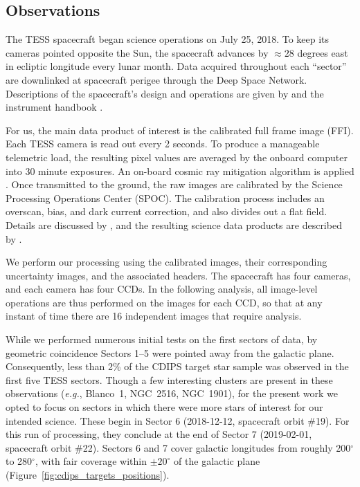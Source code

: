 \documentclass[12pt,twocolumn,tighten]{aastex62}
\begin{document}
\subsection{Observations}
\label{subsec:observations}


The TESS spacecraft began science operations on July 25, 2018.  To
keep its cameras pointed opposite the Sun, the spacecraft advances by
$\approx$$28$ degrees east in ecliptic longitude every lunar month.
Data acquired throughout each ``sector'' are downlinked at spacecraft
perigee through the Deep Space Network.  Descriptions of the
spacecraft's design and operations are given by
\citet{ricker_transiting_2015} and the instrument handbook
\citep{vanderspek_2018}.

For us, the main data product of interest is the calibrated full frame
image (FFI).  Each TESS camera is read out every 2 seconds.  To
produce a manageable telemetric load, the resulting pixel values are
averaged by the onboard computer into 30 minute exposures. An on-board
cosmic ray mitigation algorithm is applied \citep[][\S
5.1]{vanderspek_2018}. Once transmitted to the ground, the raw images
are calibrated by the Science Processing Operations Center (SPOC).  The
calibration process includes an overscan, bias, and dark current
correction, and also divides out a flat field.  Details are discussed
by \citet{clarke_kepler_2017}, and the resulting science data products
are described by \citet{tess_data_product_description_2018}.

We perform our processing using the calibrated images, their
corresponding uncertainty images, and the associated headers.  The
spacecraft has four cameras, and each camera has four CCDs.  In the
following analysis, all image-level operations are thus performed on
the images for each CCD, so that at any instant of time there are 16
independent images that require analysis.

While we performed numerous initial tests on the first sectors of
data, by geometric coincidence Sectors 1--5 were pointed away from the
galactic plane.  Consequently, less than 2\% of the CDIPS target star
sample was observed in the first five TESS sectors.  Though a few
interesting clusters are present in these observations ({\it e.g.},
Blanco~1, NGC~2516, NGC~1901), for the present work we opted to focus
on sectors in which there were more stars of interest for our intended
science.  These begin in Sector 6 (2018-12-12, spacecraft orbit \#19).
For this run of processing, they conclude at the end of Sector 7
(2019-02-01, spacecraft orbit \#22).
Sectors 6 and 7 cover galactic longitudes from roughly 200$^\circ$ to 280$^\circ$, 
with fair coverage within $\pm 20^\circ$ of the galactic plane
(Figure~\ref{fig:cdips_targets_positions}).
\end{document}
